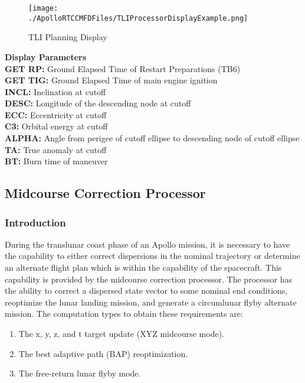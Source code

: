 \documentclass[11pt]{article} %
\begin{document}
\begin{figure}[hp]
	\centering
		\texttt{[image: ./ApolloRTCCMFDFiles/TLIProcessorDisplayExample.png]}
	\caption{TLI Planning Display}
	\label{fig:TLIProcessorDisplayExample}
\end{figure}

\textbf{Display Parameters}\\

\textbf{GET RP:} Ground Elapsed Time of Restart Preparations (TB6)\\
\textbf{GET TIG:} Ground Elapsed Time of main engine ignition\\
\textbf{INCL:} Inclination at cutoff\\
\textbf{DESC:} Longitude of the descending node at cutoff\\
\textbf{ECC:} Eccentricity at cutoff\\
\textbf{C3:} Orbital energy at cutoff\\
\textbf{ALPHA:} Angle from perigee of cutoff ellipse to descending node of cutoff ellipse\\
\textbf{TA:} True anomaly at cutoff\\
\textbf{BT:} Burn time of maneuver\\
\newpage
\subsection{Midcourse Correction Processor}

\subsubsection{Introduction}

During the translunar coast phase of an Apollo mission, it is necessary to have the capability to either correct dispersions in the nominal trajectory or determine an alternate flight plan which is within the capability of the spacecraft. This capability is provided by the midcourse correction processor. The processor has the ability to correct a dispersed state vector to some nominal end conditions, reoptimize the lunar landing mission, and generate a circumlunar flyby alternate mission. The computation types to obtain these requirements are:

\begin{enumerate}
	\item The x, y, z, and t target update (XYZ midcourse mode).
	\item The best adaptive path (BAP) reoptimization.
	\item The free-return lunar flyby mode.
\end{enumerate}
\end{document}
